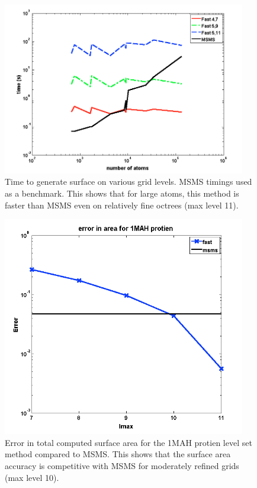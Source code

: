 \documentclass{elsarticle}
\theoremstyle{own}
\begin{document}
\begin{figure}[ht]
\begin{center}
\includegraphics[width=0.945\textwidth]{../figs/timing_msms_compare}
\end{center}
\caption{Time to generate surface on various grid levels. MSMS timings used as a benchmark. This shows that for large atoms, this method is faster than MSMS even on relatively fine octrees (max level 11).} \label{fig:timing_msms_compare}
\end{figure}


\begin{figure}[ht]
\begin{center}
\includegraphics[width=0.945\textwidth]{../figs/error_convergence_1MAH}
\end{center}
\caption{Error in total computed surface area for the 1MAH protien level set method compared to MSMS. This shows that the surface area accuracy is competitive with MSMS for moderately refined grids (max level 10).} \label{fig:error_convergence_1MAH}
\end{figure}
\end{document}
